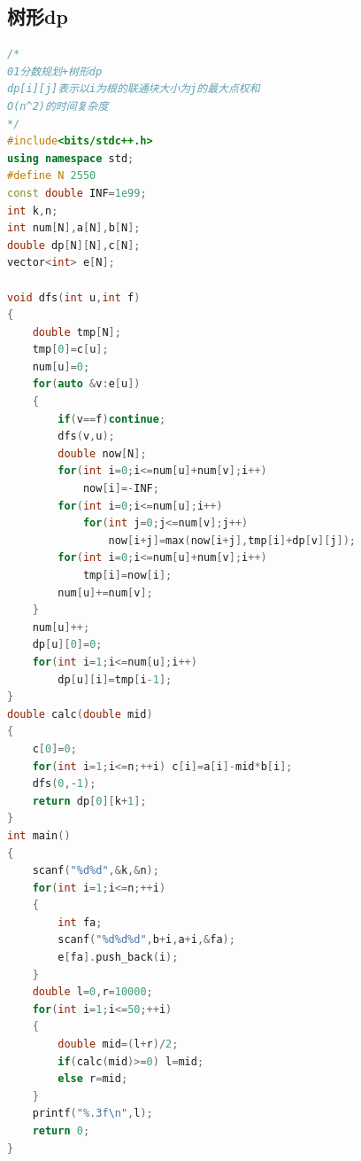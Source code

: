 \documentclass[UTF8,a4paper,titlepage]{ctexart}
\begin{document}
    \subsection{树形dp}
      \begin{lstlisting}[language=C++]
/*
01分数规划+树形dp
dp[i][j]表示以i为根的联通块大小为j的最大点权和
O(n^2)的时间复杂度
*/
#include<bits/stdc++.h>
using namespace std;
#define N 2550
const double INF=1e99;
int k,n;
int num[N],a[N],b[N];
double dp[N][N],c[N];
vector<int> e[N];

void dfs(int u,int f)
{
    double tmp[N];
    tmp[0]=c[u];
    num[u]=0;
    for(auto &v:e[u])
    {
        if(v==f)continue;
        dfs(v,u);
        double now[N];
        for(int i=0;i<=num[u]+num[v];i++)
            now[i]=-INF;
        for(int i=0;i<=num[u];i++)
            for(int j=0;j<=num[v];j++)
                now[i+j]=max(now[i+j],tmp[i]+dp[v][j]);
        for(int i=0;i<=num[u]+num[v];i++)
            tmp[i]=now[i];
        num[u]+=num[v];
    }
    num[u]++;
    dp[u][0]=0;
    for(int i=1;i<=num[u];i++)
        dp[u][i]=tmp[i-1];
}
double calc(double mid)
{
    c[0]=0;
    for(int i=1;i<=n;++i) c[i]=a[i]-mid*b[i];
    dfs(0,-1);
    return dp[0][k+1];
}
int main()
{
    scanf("%d%d",&k,&n);
    for(int i=1;i<=n;++i)
    {
        int fa;
        scanf("%d%d%d",b+i,a+i,&fa);
        e[fa].push_back(i);
    }
    double l=0,r=10000;
    for(int i=1;i<=50;++i)
    {
        double mid=(l+r)/2;
        if(calc(mid)>=0) l=mid;
        else r=mid;
    }
    printf("%.3f\n",l);
    return 0;
}
      \end{lstlisting}
\end{document}
